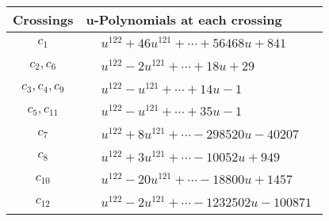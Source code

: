 \documentclass[1p]{elsarticle_modified}
\theoremstyle{definition}
\begin{document}
\begin{tabular}{m{50pt}|m{274pt}}
Crossings & \hspace{64pt}u-Polynomials at each crossing \\
\hline $$\begin{aligned}c_{1}\end{aligned}$$&$\begin{aligned}
&u^{122}+46 u^{121}+\cdots+56468 u+841
\end{aligned}$\\
\hline $$\begin{aligned}c_{2},c_{6}\end{aligned}$$&$\begin{aligned}
&u^{122}-2 u^{121}+\cdots+18 u+29
\end{aligned}$\\
\hline $$\begin{aligned}c_{3},c_{4},c_{9}\end{aligned}$$&$\begin{aligned}
&u^{122}- u^{121}+\cdots+14 u-1
\end{aligned}$\\
\hline $$\begin{aligned}c_{5},c_{11}\end{aligned}$$&$\begin{aligned}
&u^{122}- u^{121}+\cdots+35 u-1
\end{aligned}$\\
\hline $$\begin{aligned}c_{7}\end{aligned}$$&$\begin{aligned}
&u^{122}+8 u^{121}+\cdots-298520 u-40207
\end{aligned}$\\
\hline $$\begin{aligned}c_{8}\end{aligned}$$&$\begin{aligned}
&u^{122}+3 u^{121}+\cdots-10052 u+949
\end{aligned}$\\
\hline $$\begin{aligned}c_{10}\end{aligned}$$&$\begin{aligned}
&u^{122}-20 u^{121}+\cdots-18800 u+1457
\end{aligned}$\\
\hline $$\begin{aligned}c_{12}\end{aligned}$$&$\begin{aligned}
&u^{122}-2 u^{121}+\cdots-1232502 u-100871
\end{aligned}$\\
\hline
\end{tabular}\\~\\
\end{document}
